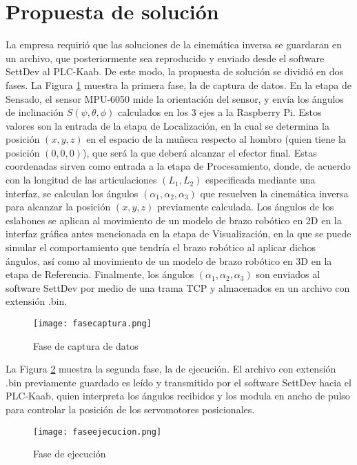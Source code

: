 \section{Propuesta de solución}

La empresa requirió que las soluciones de la cinemática inversa se guardaran en un archivo, que posteriormente sea reproducido y enviado desde el software SettDev al PLC-Kaab. De este modo, la propuesta de solución se dividió en dos fases. La Figura \ref{fig:fasecaptura} muestra la primera fase, la de captura de datos. En la etapa de Sensado, el sensor MPU-6050 mide la orientación del sensor, y envía los ángulos de inclinación $S(\psi, \theta, \phi)$ calculados en los 3 ejes a la Raspberry Pi. Estos valores son la entrada de la etapa de Localización, en la cual se determina la posición $(x, y, z)$ en el espacio de la muñeca respecto al hombro (quien tiene la posición $(0, 0, 0)$), que será la que deberá alcanzar el efector final. Estas coordenadas sirven como entrada a la etapa de Procesamiento, donde, de acuerdo con la longitud de las articulaciones $(L_1, L_2)$ especificada mediante una interfaz, se calculan los ángulos $(\alpha_1, \alpha_2, \alpha_3)$ que resuelven la cinemática inversa para alcanzar la posición $(x, y, z)$ previamente calculada. Los ángulos de los eslabones se aplican al movimiento de un modelo de brazo robótico en 2D en la interfaz gráfica antes mencionada en la etapa de Visualización, en la que se puede simular el comportamiento que tendría el brazo robótico al aplicar dichos ángulos, así como al movimiento de un modelo de brazo robótico en 3D en la etapa de Referencia. Finalmente, los ángulos $(\alpha_1, \alpha_2, \alpha_3)$ son enviados al software SettDev por medio de una trama TCP y almacenados en un archivo con extensión .bin.

\begin{figure}[htb]
	\centering
	\texttt{[image: fasecaptura.png]}
	\caption{Fase de captura de datos}
	\label{fig:fasecaptura}
\end{figure}

\newpage
La Figura \ref{fig:faseejecucion} muestra la segunda fase, la de ejecución. El archivo con extensión .bin previamente guardado es leído y transmitido por el software SettDev hacia el PLC-Kaab, quien interpreta los ángulos recibidos y los modula en ancho de pulso para controlar la posición de los servomotores posicionales.

\begin{figure}[htb]
	\centering
	\texttt{[image: faseejecucion.png]}
	\caption{Fase de ejecución}
	\label{fig:faseejecucion}
\end{figure}